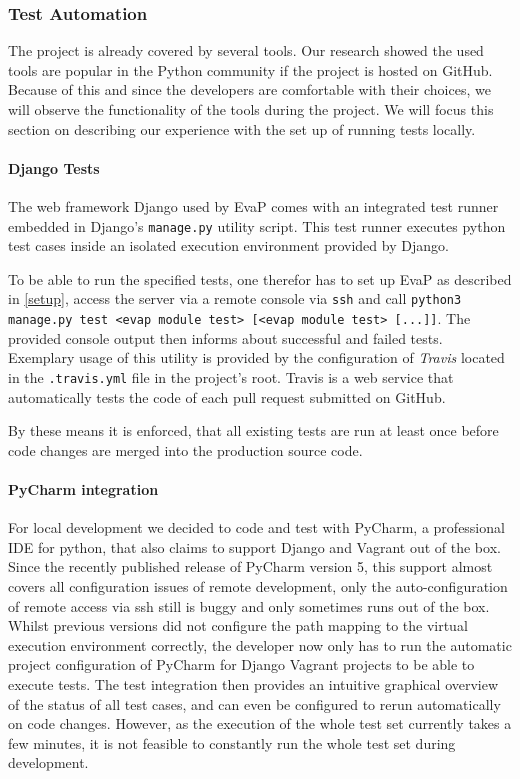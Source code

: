 \subsubsection{Test Automation}
The project is already covered by several tools.
Our research showed the used tools are popular in the Python community if the project is hosted on GitHub.
Because of this and since the developers are comfortable with their choices, we will observe the functionality of the tools during the project.
We will focus this section on describing our experience with the set up of running tests locally.

\paragraph{Django Tests}
The web framework Django used by EvaP comes with an integrated test runner embedded in Django's \texttt{manage.py} utility script.
This test runner executes python test cases inside an isolated execution environment provided by Django.

To be able to run the specified tests, one therefor has to set up EvaP as described in \autoref{setup}, access the server via a remote console via \texttt{ssh} and call \texttt{python3 manage.py test <evap module test> [<evap module test> [...]]}.
The provided console output then informs about successful and failed tests.
Exemplary usage of this utility is provided by the configuration of \textit{Travis} located in the \texttt{.travis.yml} file in the project's root.
Travis is a web service that automatically tests the code of each pull request submitted on GitHub.

By these means it is enforced, that all existing tests are run at least once before code changes are merged into the production source code.

\paragraph{PyCharm integration}
For local development we decided to code and test with PyCharm, a professional IDE for python, that also claims to support Django and Vagrant out of the box.
Since the recently published release of PyCharm version 5, this support almost covers all configuration issues of remote development, only the auto-configuration of remote access via ssh still is buggy and only sometimes runs out of the box.
Whilst previous versions did not configure the path mapping to the virtual execution environment correctly, the developer now only has to run the automatic project configuration of PyCharm for Django Vagrant projects to be able to execute tests.
The test integration then provides an intuitive graphical overview of the status of all test cases, and can even be configured to rerun automatically on code changes.
However, as the execution of the whole test set currently takes a few minutes, it is not feasible to constantly run the whole test set during development.

